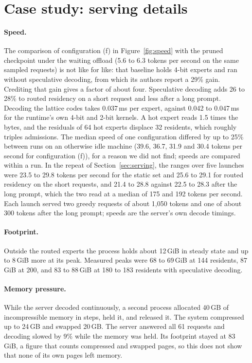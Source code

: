 \documentclass[11pt]{article}
\begin{document}
\FloatBarrier
\section{Case study: serving details}
\label{app:serving}

\paragraph{Speed.} The comparison of configuration (f) in Figure~\ref{fig:speed} with the pruned
checkpoint under the waiting offload (5.6 to 6.3 tokens per second on the same sampled
requests) is not like for like: that baseline holds 4-bit experts and ran without speculative
decoding, from which its authors report a 29\% gain. Crediting that gain gives a factor of
about four. Speculative decoding adds 26 to 28\% to routed residency on a short request and
less after a long prompt. Decoding the lattice codes takes 0.037\,ms per expert, against 0.042
to 0.047\,ms for the runtime's own 4-bit and 2-bit kernels. A hot expert reads 1.5 times the
bytes, and the residuals of 64 hot experts displace 32 residents, which roughly triples
admissions. The median speed of one configuration differed by up to 25\% between runs on an
otherwise idle machine (39.6, 36.7, 31.9 and 30.4 tokens per second for configuration (f)), for a reason
we did not find; speeds are compared within a run. In the repeat of Section~\ref{sec:serving}, the ranges over five launches were 23.5 to 29.8 tokens per second for the static set and 25.6 to 29.1 for routed residency on the short requests, and 21.4 to 28.8 against 22.5 to 28.3 after the long prompt, which the two read at a median of 175 and 192 tokens per second. Each launch served two greedy requests of about 1{,}050 tokens and one of about 300 tokens after the long prompt; speeds are the server's own decode timings.

\paragraph{Footprint.} Outside the routed experts the process holds about 12\,GiB in steady
state and up to 8\,GiB more at its peak. Measured peaks were 68 to 69\,GiB at 144 residents, 87\,GiB at 200, and 83 to 88\,GiB at 180 to 183 residents with speculative decoding.

\paragraph{Memory pressure.} While the server decoded continuously, a second process allocated
40\,GB of incompressible memory in steps, held it, and released it. The system compressed up to
24\,GB and swapped 20\,GB. The server answered all 61 requests and decoding slowed by 9\% while
the memory was held. Its footprint stayed at 83\,GiB, a figure that counts compressed and
swapped pages, so this does not show that none of its own pages left memory.
\end{document}
